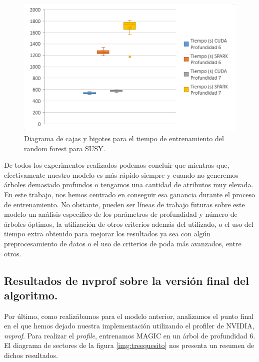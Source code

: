 \begin{figure}[ht]
\centering
\includegraphics[scale=1.0]{imagenes/boxplot_rf.png}
\caption{Diagrama de cajas y bigotes para el tiempo de entrenamiento del random forest para SUSY.}
\label{img:boxplot}
\end{figure}

De todos los experimentos realizados podemos concluir que mientras que, efectivamente nuestro modelo es más rápido siempre y cuando no generemos árboles demasiado profundos o tengamos una cantidad de atributos muy elevada. En este trabajo, nos hemos centrado en conseguir esa ganancia durante el proceso de entrenamiento. No obstante, pueden ser líneas de trabajo futuras sobre este modelo un análisis específico de los parámetros de profundidad y número de árboles óptimos, la utilización de otros criterios además del utilizado, o el uso del tiempo extra obtenido para mejorar los resultados ya sea con algún preprocesamiento de datos o el uso de criterios de poda más avanzados, entre otros.\\

\subsection{Resultados de nvprof sobre la versión final del algoritmo.}
Por último, como realizábamos para el modelo anterior, analizamos el punto final en el que hemos dejado nuestra implementación utilizando el profiler de NVIDIA, \textit{nvprof}. Para realizar el \textit{profile}, entrenamos MAGIC en un árbol de profundidad 6. El diagrama de sectores de la figura \ref{img:treequesito} nos presenta un resumen de dichos resultados.\\

